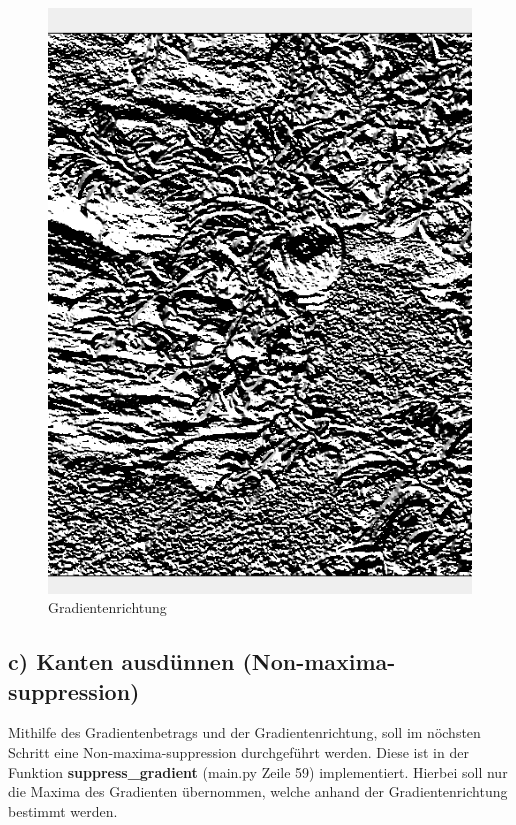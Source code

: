 \documentclass[12pt]{article}
\begin{document}
\begin{figure}[H]
\begin{minipage}{0.49\textwidth}
    \includegraphics[width=\textwidth, height=0.4\textheight, keepaspectratio]{direction.png}
    Gradientenrichtung
  \end{minipage}
\end{figure}

\subsection*{c) Kanten ausdünnen (Non-maxima-suppression)}
Mithilfe des Gradientenbetrags und der Gradientenrichtung, soll im nöchsten Schritt eine Non-maxima-suppression durchgeführt werden.
Diese ist in der Funktion \textbf{suppress\_gradient} (main.py Zeile 59) implementiert.
Hierbei soll nur die Maxima des Gradienten übernommen, welche anhand der Gradientenrichtung bestimmt werden.
\end{document}

